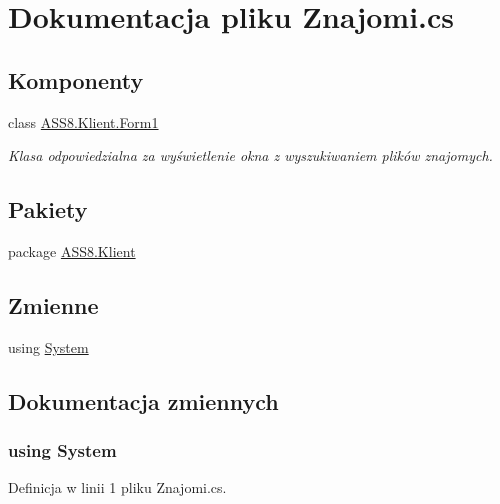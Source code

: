 \hypertarget{a00057}{
\section{Dokumentacja pliku Znajomi.cs}
\label{d1/d22/a00057}
}
\subsection*{Komponenty}
\begin{CompactItemize}
\item 
class \hyperlink{a00003}{ASS8.Klient.Form1}
\begin{CompactList}\small\item\em Klasa odpowiedzialna za wyświetlenie okna z wyszukiwaniem plików znajomych. \item\end{CompactList}\end{CompactItemize}
\subsection*{Pakiety}
\begin{CompactItemize}
\item 
package \hyperlink{a00060}{ASS8.Klient}
\end{CompactItemize}
\subsection*{Zmienne}
\begin{CompactItemize}
\item 
﻿using \hyperlink{a00057_81a223a02c34d82b47199f08308847f2}{System}
\end{CompactItemize}


\subsection{Dokumentacja zmiennych}
\hypertarget{a00057_81a223a02c34d82b47199f08308847f2}{
\subsubsection[{System}]{\setlength{\rightskip}{0pt plus 5cm}﻿using {\bf System}}}
\label{d1/d22/a00057_81a223a02c34d82b47199f08308847f2}




Definicja w linii 1 pliku Znajomi.cs.